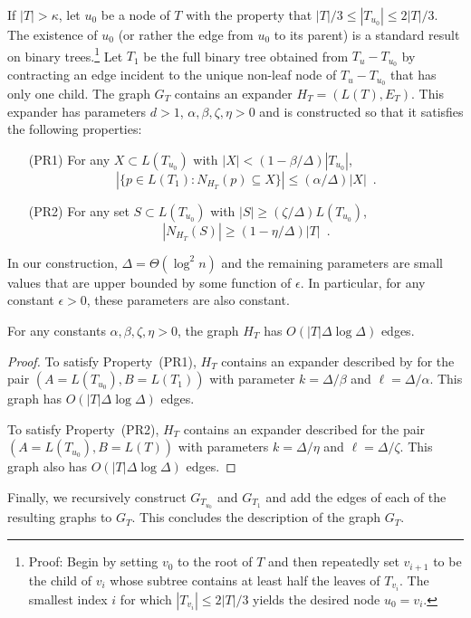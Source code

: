 \documentclass{patmorin}
\begin{document}
If $|T|>\kappa$, let $u_0$ be a node of $T$ with the property that
$|T|/3\le |T_{u_0}|\le 2|T|/3$.  The existence of $u_0$ (or rather
the edge from $u_0$ to its parent) is a standard result on binary
trees.\footnote{Proof: Begin by setting $v_0$ to the root of $T$ and then repeatedly set $v_{i+1}$ to be the child of $v_i$ whose subtree contains at least half the leaves of $T_{v_i}$.  The smallest index $i$ for which $|T_{v_i}|\le 2|T|/3$ yields the desired node $u_0=v_i$.}   Let $T_1$ be the full binary tree obtained from
$T_u-T_{u_0}$ by contracting an edge incident to the unique non-leaf node
of $T_u-T_{u_0}$ that has only one child.  The graph $G_{T}$ contains
an expander $H_T=(L(T),E_T)$. This expander has parameters $d>1$,
$\alpha, \beta,\zeta,\eta > 0$ and is constructed so that it satisfies
the following properties:
\begin{enumerate}
  \item[(PR1)] For any $X\subset L(T_{u_0})$ with
    $|X|<(1-\beta/\Delta)|T_{u_0}|$, 
    \[ |\{p\in L(T_1): N_{H_T}(p)\subseteq X\}|\le (\alpha/\Delta)|X| \enspace . \]

  \item[(PR2)] For any set $S\subset L(T_{u_0})$ with $|S|\ge
    (\zeta/\Delta)L(T_{u_0})$, \[ |N_{H_T}(S)|\ge (1-\eta/\Delta)|T| \enspace .\]
\end{enumerate}
In our construction, $\Delta=\Theta(\log^2 n)$ and the remaining parameters
are small values that are upper bounded by some function of $\epsilon$. In particular, for any constant $\epsilon >0$, these parameters are also constant.

\begin{clm}
  For any constants $\alpha,\beta,\zeta,\eta>0$, the graph $H_T$ has
  $O(|T|\Delta\log\Delta)$ edges.
\end{clm}

\begin{proof}
  To satisfy Property~(PR1), $H_T$ contains an expander described
  by  for the pair $(A=L(T_{u_0}),B=L(T_1))$ with
  parameter $k=\Delta/\beta$ and $\ell=\Delta/\alpha$.  This graph has
  $O(|T|\Delta\log\Delta)$ edges.

  To satisfy Property~(PR2), $H_T$ contains an expander described
   for the pair $(A=L(T_{u_0}),B=L(T))$ with
  parameters $k=\Delta/\eta$ and $\ell=\Delta/\zeta$. This graph also
  has $O(|T|\Delta\log\Delta)$ edges.
\end{proof}

Finally, we recursively construct $G_{T_{u_0}}$ and $G_{T_1}$ and add the
edges of each of the resulting graphs to $G_{T}$. This concludes the description of the graph $G_T$.
\end{document}
